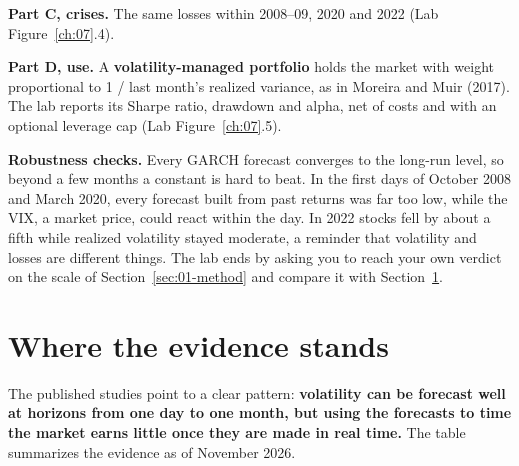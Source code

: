 \textbf{Part C, crises.} The same losses within 2008--09, 2020 and 2022 (Lab Figure~\ref{ch:07}.4).

\textbf{Part D, use.} A \textbf{volatility-managed portfolio} holds the market with weight proportional to 1 / last month's realized variance, as in Moreira and Muir (2017). The lab reports its Sharpe ratio, drawdown and alpha, net of costs and with an optional leverage cap (Lab Figure~\ref{ch:07}.5).

\label{sec:10-stress}
\textbf{Robustness checks.} Every GARCH forecast converges to the long-run level, so beyond a few months a constant is hard to beat. In the first days of October 2008 and March 2020, every forecast built from past returns was far too low, while the VIX, a market price, could react within the day. In 2022 stocks fell by about a fifth while realized volatility stayed moderate, a reminder that volatility and losses are different things. The lab ends by asking you to reach your own verdict on the scale of Section~\ref{sec:01-method} and compare it with Section~\ref{sec:10-verdict}.

\section{Where the evidence stands}
\label{sec:10-verdict}

The published studies point to a clear pattern: \textbf{volatility can be forecast well at horizons from one day to one month, but using the forecasts to time the market earns little once they are made in real time.} The table summarizes the evidence as of November 2026.

